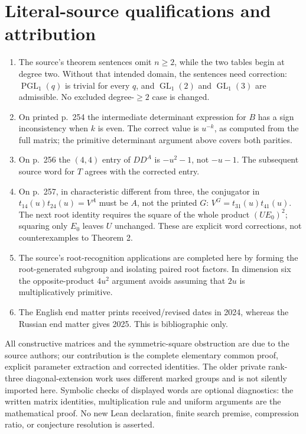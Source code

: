 \documentclass[11pt]{article}
\newcommand{\GL}{\operatorname{GL}}\newcommand{\SL}{\operatorname{SL}}
\newcommand{\PGL}{\operatorname{PGL}}\newcommand{\PSL}{\operatorname{PSL}}
\begin{document}
\section{Literal-source qualifications and attribution}
\begin{enumerate}
\item The source's theorem sentences omit $n\geq2$, while the two tables
begin at degree two. Without that intended domain, the sentences need
correction: $\PGL_1(q)$ is trivial for every $q$, and $\GL_1(2)$ and
$\GL_1(3)$ are admissible. No excluded degree-$\geq2$ case is changed.
\item On printed p.~254 the intermediate determinant expression for $B$
has a sign inconsistency when $k$ is even. The correct value is
$u^{-k}$, as computed from the full matrix; the primitive determinant
argument above covers both parities.
\item On p.~256 the $(4,4)$ entry of $DD^A$ is $-u^2-1$, not $-u-1$.
The subsequent source word for $T$ agrees with the corrected entry.
\item On p.~257, in characteristic different from three, the conjugator
in $t_{14}(u)t_{24}(u)=V^A$ must be $A$, not the printed $G$:
$V^G=t_{31}(u)t_{41}(u)$. The next root identity requires the square of
the whole product $(UE_0)^2$; squaring only $E_0$ leaves $U$ unchanged.
These are explicit word corrections, not counterexamples to Theorem 2.
\item The source's root-recognition applications are completed here by
forming the root-generated subgroup and isolating paired root factors.
In dimension six the opposite-product $4u^2$ argument avoids assuming
that $2u$ is multiplicatively primitive.
\item The English end matter prints received/revised dates in 2024,
whereas the Russian end matter gives 2025. This is bibliographic only.
\end{enumerate}
All constructive matrices and the symmetric-square obstruction are due
to the source authors; our contribution is the complete elementary common
proof, explicit parameter extraction and corrected identities. The older
private rank-three diagonal-extension work uses different marked groups
and is not silently imported here. Symbolic checks of displayed words
are optional diagnostics: the written matrix identities, multiplication
rule and uniform arguments are the mathematical proof. No new Lean
declaration, finite search premise, compression ratio, or conjecture
resolution is asserted.
\end{document}
